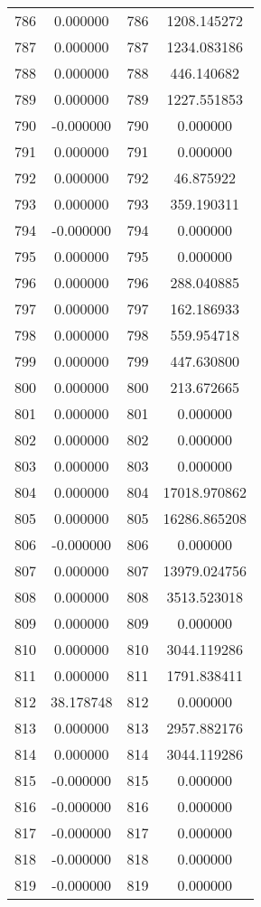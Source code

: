 \documentclass[12pt]{article}
\begin{document}
\begin{longtable}{@{}cccc@{}}
786 & 0.000000 & 786 & 1208.145272 \\
787 & 0.000000 & 787 & 1234.083186 \\
788 & 0.000000 & 788 & 446.140682 \\
789 & 0.000000 & 789 & 1227.551853 \\
790 & -0.000000 & 790 & 0.000000 \\
791 & 0.000000 & 791 & 0.000000 \\
792 & 0.000000 & 792 & 46.875922 \\
793 & 0.000000 & 793 & 359.190311 \\
794 & -0.000000 & 794 & 0.000000 \\
795 & 0.000000 & 795 & 0.000000 \\
796 & 0.000000 & 796 & 288.040885 \\
797 & 0.000000 & 797 & 162.186933 \\
798 & 0.000000 & 798 & 559.954718 \\
799 & 0.000000 & 799 & 447.630800 \\
800 & 0.000000 & 800 & 213.672665 \\
801 & 0.000000 & 801 & 0.000000 \\
802 & 0.000000 & 802 & 0.000000 \\
803 & 0.000000 & 803 & 0.000000 \\
804 & 0.000000 & 804 & 17018.970862 \\
805 & 0.000000 & 805 & 16286.865208 \\
806 & -0.000000 & 806 & 0.000000 \\
807 & 0.000000 & 807 & 13979.024756 \\
808 & 0.000000 & 808 & 3513.523018 \\
809 & 0.000000 & 809 & 0.000000 \\
810 & 0.000000 & 810 & 3044.119286 \\
811 & 0.000000 & 811 & 1791.838411 \\
812 & 38.178748 & 812 & 0.000000 \\
813 & 0.000000 & 813 & 2957.882176 \\
814 & 0.000000 & 814 & 3044.119286 \\
815 & -0.000000 & 815 & 0.000000 \\
816 & -0.000000 & 816 & 0.000000 \\
817 & -0.000000 & 817 & 0.000000 \\
818 & -0.000000 & 818 & 0.000000 \\
819 & -0.000000 & 819 & 0.000000 \\

\end{longtable}
\end{document}
